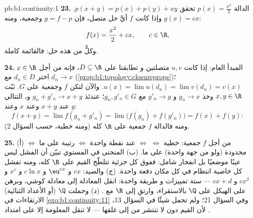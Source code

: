 \begin{solution}{pb:b1:continuity:1}
\textbf{23.} الدالة $p(x) = \frac{x^2}{2}$ تحقق $p(x+y) = p(x) +
p(y) + xy$. وإذا كانت $f$ أيَّ حل متصل، فإن $g = f - p$
 وجمعية، ومنه $g(x) = cx$:
\[
f(x) = \frac{x^2}{2} + cx , \qquad c \in \R ,
\]
وكلٌّ من هذه حل: فالقائمة كاملة.

\textbf{24.} المبدأ العام: إذا كانت $u, v$ متصلتين و
تطابقتا على   $D \subseteq \R$، فإنه من أجل $x \in \R$ اختر
$d_n \in D$ مع $d_n \to x$
(\cref{prop:b1:topology:closureprops})؛ $u(x) = \lim u(d_n) =
\lim v(d_n) = v(x)$. والآن لتكن $f$  وجمعية على
  $G$. ثبّت $x, y \in \R$ وخذ $g_n \to x$ و
$g'_n \to y$ مع $g_n, g'_n \in G$؛ عندئذ $g_n + g'_n \to x + y$
و،  التتالي عند $x + y$ وعند $x$ وعند $y$:
\[
f(x + y) = \lim f(g_n + g'_n) = \lim\bigl(f(g_n) +
f(g'_n)\bigr) = f(x) + f(y) :
\]
ومنه فالدالة $f$ جمعية على $\R$ كله (ومنه خطية، حسب السؤال 2).

\textbf{25.} (أ) من أجل $f$ جمعية: خطية $\iff$ 
$\iff$  عند نقطة واحدة $\iff$ رتيبة على  ما
$\iff$ محدودة (ولو من جهة واحدة) على  ما. (ب) 
المنحنى في المستوي تبيّن أن الفشل ليس عيبًا
موضعيًا بل انفجار شامل: ففوق كل  جزئية تتلطّخ
القيم على $\R$ كله، ومنه تفشل كل خاصية انتظام
في كل مكان دفعة واحدة. (ج) والصيد: $cx$ و $\eu^{cx}$ و
$c\ln x$ و $x^c$ و $cx^2$ و $cx + d$ --- ستة تمييزات و
طريقة واحدة: انقل المعادلة إلى معادلة كوشي، وبرهن على
الهيكل على $\Q$ بالاستقراء، وارتقِ إلى $\R$  مع
. (د) وحملت  $\Q$ (أو الأعداد الثنائية)
الارتقاءات في \cref{exo:b1:continuity:11} وفي السؤال 21؛ ولم
تحمل شيئًا في السؤال 13، لأن القيم دون 
لا تنتشر من   إلى غلقها ---
 لا تنقل المعلومة إلا على امتداد .
\end{solution}
